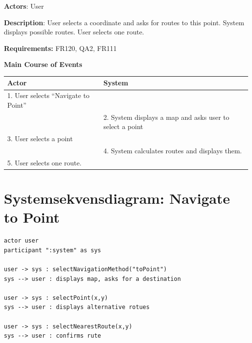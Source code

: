 \documentclass[10pt,a4paper]{article}
\begin{document}
\textbf{Actors}: User

\textbf{Description}: User selects a coordinate and asks for routes to this point. System displays possible routes. User selects one route. 

\textbf{Requirements:} FR120, QA2, FR111

\textbf{Main Course of Events}
\begin{center}
\begin{tabular}{ll}
Actor & System\\
\hline
1. User selects ``Navigate to Point'' & \\
 & 2. System displays a map and asks user to select a point\\
3. User selects a point & \\
 & 4. System calculates routes and displays them.\\
5. User selects one route. & \\
\hline
\end{tabular}
\end{center}

\section{Systemsekvensdiagram: Navigate to Point}
\label{sec:org6a6efe9}
\begin{verbatim}
actor user
participant ":system" as sys

user -> sys : selectNavigationMethod("toPoint")
sys --> user : displays map, asks for a destination

user -> sys : selectPoint(x,y)
sys --> user : displays alternative rotues

user -> sys : selectNearestRoute(x,y)
sys --> user : confirms rute

\end{verbatim}
\end{document}
